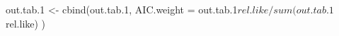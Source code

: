 \begin{Schunk}
\begin{Sinput}
 out.tab.1 <- cbind(out.tab.1,
   AIC.weight = out.tab.1$rel.like / sum(out.tab.1$rel.like)
 )
\end{Sinput}
\end{Schunk}
